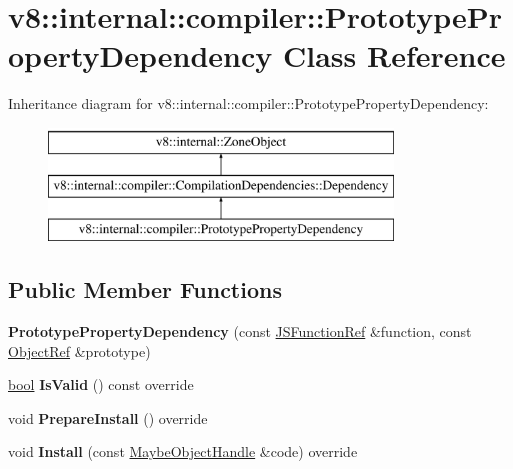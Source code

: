 \hypertarget{classv8_1_1internal_1_1compiler_1_1PrototypePropertyDependency}{}\section{v8\+:\+:internal\+:\+:compiler\+:\+:Prototype\+Property\+Dependency Class Reference}
\label{classv8_1_1internal_1_1compiler_1_1PrototypePropertyDependency}
Inheritance diagram for v8\+:\+:internal\+:\+:compiler\+:\+:Prototype\+Property\+Dependency\+:\begin{figure}[H]
\begin{center}
\leavevmode
\includegraphics[height=3.000000cm]{classv8_1_1internal_1_1compiler_1_1PrototypePropertyDependency}
\end{center}
\end{figure}
\subsection*{Public Member Functions}
\begin{DoxyCompactItemize}
\item 
\mbox{\label{classv8_1_1internal_1_1compiler_1_1PrototypePropertyDependency_a12620aa5d65dd8e07a8accae3377621d}} 
{\bfseries Prototype\+Property\+Dependency} (const \mbox{\hyperlink{classv8_1_1internal_1_1compiler_1_1JSFunctionRef}{J\+S\+Function\+Ref}} \&function, const \mbox{\hyperlink{classv8_1_1internal_1_1compiler_1_1ObjectRef}{Object\+Ref}} \&prototype)
\item 
\mbox{\label{classv8_1_1internal_1_1compiler_1_1PrototypePropertyDependency_ac95be591ee66c321944247a7f442b415}} 
\mbox{\hyperlink{classbool}{bool}} {\bfseries Is\+Valid} () const override
\item 
\mbox{\label{classv8_1_1internal_1_1compiler_1_1PrototypePropertyDependency_a173a9ea19c2a619b3b88e79ba409db71}} 
void {\bfseries Prepare\+Install} () override
\item 
\mbox{\label{classv8_1_1internal_1_1compiler_1_1PrototypePropertyDependency_a29363cfcfa71eaa443caaacf5b3a2aef}} 
void {\bfseries Install} (const \mbox{\hyperlink{classv8_1_1internal_1_1MaybeObjectHandle}{Maybe\+Object\+Handle}} \&code) override
\end{DoxyCompactItemize}


